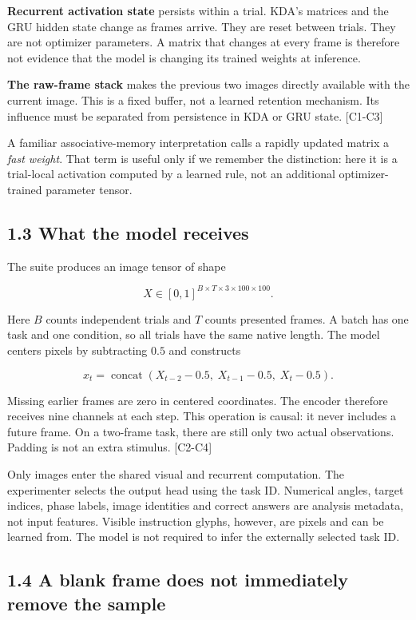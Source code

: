 \documentclass[
  11pt,
]{article}
\let\oldsubsection\subsection
\renewcommand{\subsection}{\Needspace{6\baselineskip}\oldsubsection}
\begin{document}
\textbf{Recurrent activation state} persists within a trial. KDA's
matrices and the GRU hidden state change as frames arrive. They are
reset between trials. They are not optimizer parameters. A matrix that
changes at every frame is therefore not evidence that the model is
changing its trained weights at inference.

\textbf{The raw-frame stack} makes the previous two images directly
available with the current image. This is a fixed buffer, not a learned
retention mechanism. Its influence must be separated from persistence in
KDA or GRU state. {[}C1-C3{]}

A familiar associative-memory interpretation calls a rapidly updated
matrix a \emph{fast weight}. That term is useful only if we remember the
distinction: here it is a trial-local activation computed by a learned
rule, not an additional optimizer-trained parameter tensor.

\subsection{1.3 What the model receives}\label{what-the-model-receives}

The suite produces an image tensor of shape

\[X\in[0,1]^{B\times T\times3\times100\times100}.\]

Here \(B\) counts independent trials and \(T\) counts presented frames.
A batch has one task and one condition, so all trials have the same
native length. The model centers pixels by subtracting \(0.5\) and
constructs

\[x_t=\operatorname{concat}(X_{t-2}-0.5,\;X_{t-1}-0.5,\;X_t-0.5).\]

Missing earlier frames are zero in centered coordinates. The encoder
therefore receives nine channels at each step. This operation is causal:
it never includes a future frame. On a two-frame task, there are still
only two actual observations. Padding is not an extra stimulus.
{[}C2-C4{]}

Only images enter the shared visual and recurrent computation. The
experimenter selects the output head using the task ID. Numerical
angles, target indices, phase labels, image identities and correct
answers are analysis metadata, not input features. Visible instruction
glyphs, however, are pixels and can be learned from. The model is not
required to infer the externally selected task ID.

\subsection{1.4 A blank frame does not immediately remove the
sample}\label{a-blank-frame-does-not-immediately-remove-the-sample}
\end{document}
